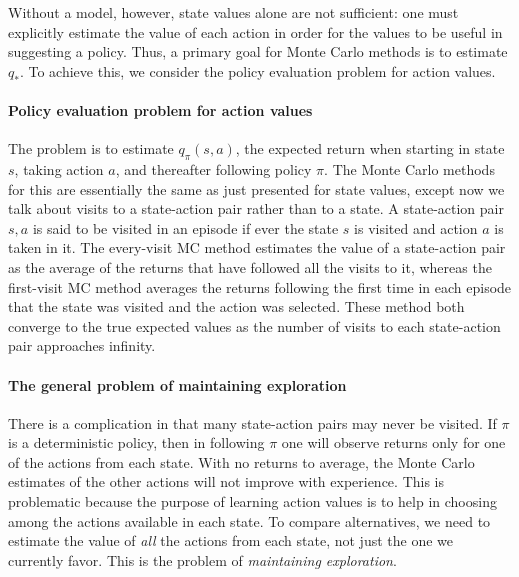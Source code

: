 \documentclass[12pt]{article}
\begin{document}
Without a model, however, state values alone are not sufficient: one must explicitly estimate the value of each action in order for the values to be useful in suggesting a policy. Thus, a primary goal for Monte Carlo methods is to estimate $q_*$. To achieve this, we consider the policy evaluation problem for action values.

\paragraph{Policy evaluation problem for action values} The problem is to estimate $q_\pi(s,a)$, the expected return when starting in state $s$, taking action $a$, and thereafter following policy $\pi$. The Monte Carlo methods for this are essentially the same as just presented for state values, except now we talk about visits to a state-action pair rather than to a state. A state-action pair $s,a$ is said to be visited in an episode if ever the state $s$ is visited and action $a$ is taken in it. The every-visit MC method estimates the value of a state-action pair as the average of the returns that have followed all the visits to it, whereas the first-visit MC method averages the returns following the first time in each episode that the state was visited and the action was selected. These method both converge to the true expected values as the number of visits to each state-action pair approaches infinity.

\paragraph{The general problem of maintaining exploration} There is a complication in that many state-action pairs may never be visited. If $\pi$ is a deterministic policy, then in following $\pi$ one will observe returns only for one of the actions from each state. With no returns to average, the Monte Carlo estimates of the other actions will not improve with experience. This is problematic because the purpose of learning action values is to help in choosing among the actions available in each state. To compare alternatives, we need to estimate the value of \emph{all} the actions from each state, not just the one we currently favor. This is the problem of \emph{maintaining exploration}.
\end{document}
